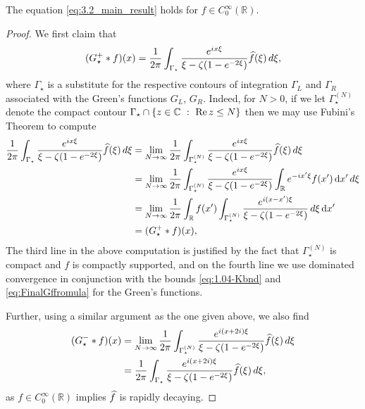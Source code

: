 \documentclass[../dissertation.tex]{subfiles}
\begin{document}
\begin{lma}\label{lma:3.2_ie_compact}
	The equation \eqref{eq:3.2_main_result} holds for $f \in C_0^\infty(\mathbb R)$.
\end{lma}
\begin{proof}
	We first claim that 
	\begin{align}
		(G_\star^+ * f)(x) 
			= \frac{1}{2\pi} 
				\int_{\Gamma_\star} 
					\frac{e^{ix\xi}}{\xi-\zeta(1-e^{-2\xi})}\widehat{f}(\xi)
				\,d\xi,
	\end{align}
	where $\Gamma_\star$ is a substitute for the respective contours of integration 
	$\Gamma_L$ and $\Gamma_R$ associated with the Green's functions $G_L$, $G_R$. 
	Indeed, for $N>0$, if we let $\Gamma^{(N)}_\star$ denote the compact contour 
	$\Gamma_\star \cap \{ z \in \mathbb C ~:~ \operatorname{Re} z \leq N \}$ then we may
	use Fubini's Theorem to compute
	\begin{align*}
		\frac{1}{2\pi} 
				\int_{\Gamma_\star} 
					\frac{e^{ix\xi}}{\xi-\zeta(1-e^{-2\xi})}\widehat{f}(\xi)
				\,d\xi
			&= \lim_{N\to\infty} \frac{1}{2\pi} 
				\int_{\Gamma_\star^{(N)}} 
					\frac{e^{ix\xi}}{\xi-\zeta(1-e^{-2\xi})}\widehat{f}(\xi)
				\,d\xi \\
			&= \lim_{N\to\infty} \frac{1}{2\pi} 
				\int_{\Gamma_\star^{(N)}} 
					\frac{e^{ix\xi}}{\xi-\zeta(1-e^{-2\xi})}
					\int_{\mathbb R} e^{-i x' \xi} f(x') \, \mathrm{d}x'
				\,d\xi \\
			&= \lim_{N\to\infty} \frac{1}{2\pi} 
				\int_{\mathbb R}
					f(x')
					\int_{\Gamma_\star^{(N)}} 
						 \frac{e^{i(x-x')\xi}}{\xi-\zeta(1-e^{-2\xi})}
				\,d\xi \, \mathrm{d}x' \\
			&= (G_\star^+ * f)(x),
	\end{align*}
	The third line in the above computation is justified by the fact that
	$\Gamma_\star^{(N)}$ is compact and $f$ is compactly supported, and 
	on the fourth line we use dominated convergence in conjunction with
	the bounds \eqref{eq:1.04-Kbnd} and \eqref{eq:FinalGffromula} for the 
	Green's functions. 

	Further, using a similar argument as the one given above, we also find
	\begin{align}
		(G_\star^- * f)(x)
			&= \lim_{N\to\infty} \frac{1}{2\pi} 
				\int_{\Gamma_\star^{(N)}} 
					\frac{e^{i(x+2i)\xi}}{\xi-\zeta(1-e^{-2\xi})}\widehat{f}(\xi)
				\,d\xi \nonumber \\
			&= \frac{1}{2\pi} 
				\int_{\Gamma_\star} 
					\frac{e^{i(x+2i)\xi}}{\xi-\zeta(1-e^{-2\xi})}\widehat{f}(\xi)
				\,d\xi,
	\end{align}
	as $f\in C_0^\infty(\mathbb R)$ implies $\widehat{f}$ is rapidly decaying.


\end{proof}
\end{document}

